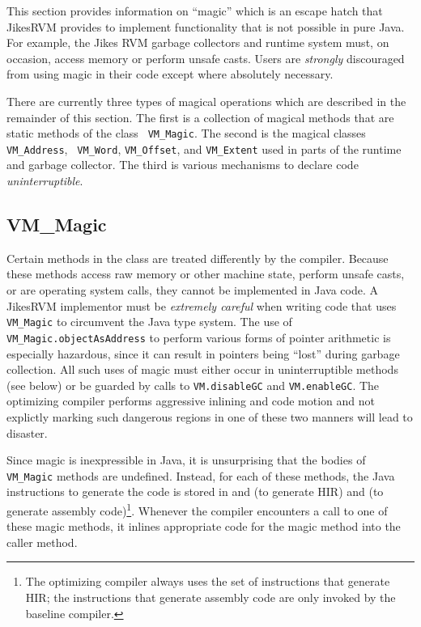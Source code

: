 This section provides information on ``magic'' which is an escape
hatch that Jikes\trademark RVM provides to implement
functionality that is not 
possible in pure Java\trademark.  For example, the Jikes RVM garbage
collectors and 
runtime system must, on occasion, access memory or perform unsafe
casts.  Users are {\it strongly} discouraged from using magic in their code
except where absolutely necessary.  

There are currently three types of magical operations which are
described in the remainder of this section.  The first is a collection
of magical methods that are static methods of the class {\tt
VM\_Magic}.  The second is the magical classes {\tt VM\_Address}, {\tt
VM\_Word}, {\tt VM\_Offset}, and  {\tt VM\_Extent} used in
parts of the runtime and garbage collector. The third is various
mechanisms to declare code {\em uninterruptible}.

\subsection{VM\_Magic}
Certain methods in the class  are
treated differently by the compiler. Because these methods access raw
memory or other machine state, perform unsafe casts, or are operating
system calls, they cannot be implemented in Java code.  A
Jikes\trademark RVM implementor must be {\em extremely careful} when
writing code that uses {\tt VM\_Magic} to circumvent the Java type
system.  The use of {\tt VM\_Magic.objectAsAddress} to perform various
forms of pointer arithmetic is especially hazardous, since it can
result in pointers being ``lost'' during garbage collection.  All such
uses of magic must either occur in uninterruptible methods (see below)
or be guarded by calls to {\tt VM.disableGC} and {\tt VM.enableGC}.
The optimizing compiler performs aggressive inlining and code motion
and not explictly marking such dangerous regions in one of these two
manners will lead to disaster.

Since magic is inexpressible in Java, it is unsurprising that the
bodies of {\tt VM\_Magic} methods are undefined.  Instead, for each of
these methods, the Java instructions to generate the code is stored in
 and 
 (to generate HIR) and 
 (to generate assembly code)\footnote{The optimizing
compiler always uses the set of instructions that generate HIR; the
instructions that generate assembly code are only invoked by the
baseline compiler.}.  Whenever the compiler encounters a call to one of these
magic methods, it inlines appropriate code for the magic method into the caller method.

